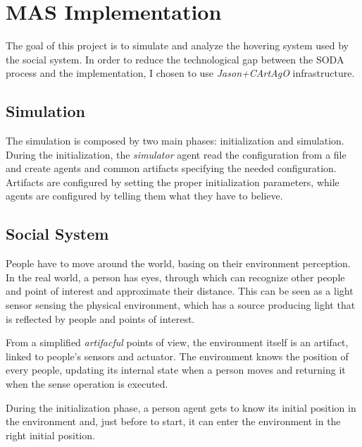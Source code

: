 \section{MAS Implementation}

The goal of this project is to simulate and analyze the
hovering system used by the social system. In order to
reduce the technological gap between the SODA process and
the implementation, I chosen to use \emph{Jason+CArtAgO}
infrastructure.

\subsection{Simulation}
The simulation is composed by two main phases: initialization
and simulation. During the initialization, the \emph{simulator}
agent read the configuration from a file and create agents and
common artifacts specifying the needed configuration. Artifacts
are configured by setting the proper initialization parameters,
while agents are configured by telling them what they have to
believe.

\subsection{Social System}
People have to move around the world, basing on
their environment perception. In the real world,
a person has eyes, through which can recognize other
people and point of interest and approximate their distance.
This can be seen as a light sensor sensing the
physical environment, which has a source producing light
that is reflected by people and points of interest.

From a simplified \emph{artifacful} points of view, the
environment itself is an artifact, linked to people's
sensors and actuator. The environment knows the position of
every people, updating its internal state when a person moves
and returning it when the sense operation is executed.

During the initialization phase, a person agent gets to know
its initial position in the environment and, just before to start,
it can enter the environment in the right initial position.
